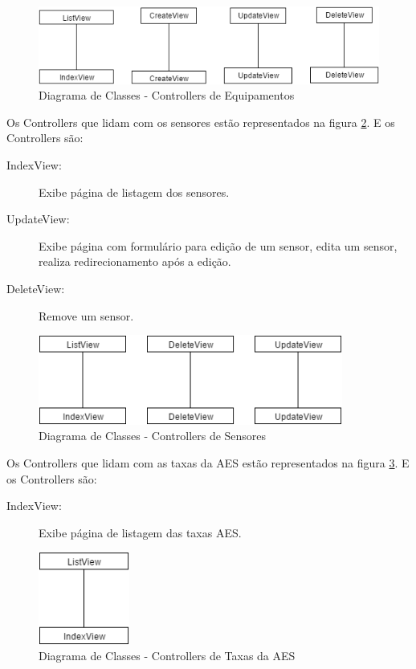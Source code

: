 \begin{figure}[H]
\centering
\includegraphics[width=14cm,keepaspectratio]{figuras/diagrama_cont_equipment.png}
\caption{\label{fig:diagrama-cont-equipment} Diagrama de Classes - Controllers de Equipamentos}
\end{figure}

Os Controllers que lidam com os sensores estão representados na figura \ref{fig:diagrama-cont-sensor}. E os Controllers são:
\begin{description}
	\item[IndexView:] Exibe página de listagem dos sensores.
	\item[UpdateView:] Exibe página com formulário para edição de um sensor, edita um sensor, realiza redirecionamento após a edição.
	\item[DeleteView:] Remove um sensor.
\end{description} 

\begin{figure}[H]
\centering
\includegraphics[width=10cm,keepaspectratio]{figuras/diagrama_cont_sensor.png}
\caption{\label{fig:diagrama-cont-sensor} Diagrama de Classes - Controllers de Sensores}
\end{figure}

Os Controllers que lidam com as taxas da AES estão representados na figura \ref{fig:diagrama-cont-aesrate}. E os Controllers são:
\begin{description}
	\item[IndexView:] Exibe página de listagem das taxas AES.
\end{description} 

\begin{figure}[H]
\centering
\includegraphics[width=3cm,keepaspectratio]{figuras/diagrama_cont_aesrate.png}
\caption{\label{fig:diagrama-cont-aesrate} Diagrama de Classes - Controllers de Taxas da AES}
\end{figure}

